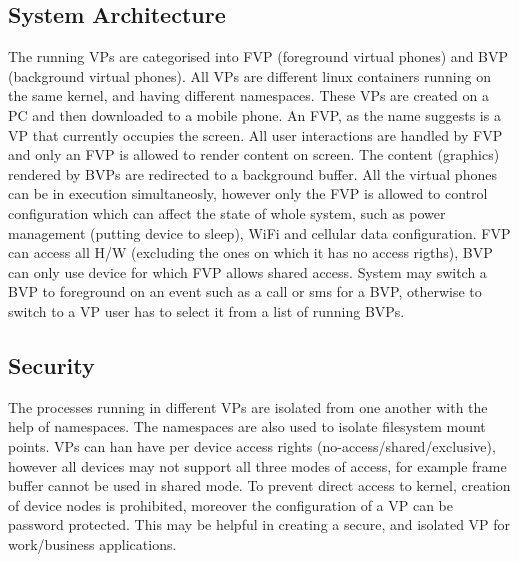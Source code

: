 \documentclass[a4paper,10pt]{article}
\begin{document}
\subsection*{System Architecture}
The running VPs are categorised into FVP (foreground virtual phones) and BVP (background virtual phones). 
All VPs are different linux containers running on the same kernel, and having different namespaces.
These VPs are created on a PC and then downloaded to a mobile phone.
An FVP, as the name suggests is a VP that currently occupies the screen. All user interactions are handled by FVP and only an FVP is allowed to render content on screen. The 
content (graphics) rendered by BVPs are redirected to a background buffer. All the virtual phones can be in execution simultaneosly, however
 only the FVP is allowed to control configuration which can affect the state of whole system, such as power management (putting device to sleep), WiFi
 and cellular data configuration.
 FVP can access all H/W (excluding the ones on which it has no access rigths), BVP can only use device for which FVP allows shared access.
 System may switch a BVP to foreground on an event such as a call or sms for a BVP, otherwise to switch to a VP user has to select it from a list of running BVPs.
 \subsection*{Security}
 The processes running in different VPs are isolated from one another with the help of namespaces.
 The namespaces are also used to isolate filesystem mount points.
 VPs can han have per device access rights (no-access/shared/exclusive), however all devices may not support all three modes of access, for example frame buffer cannot be used in shared mode.
 To prevent direct access to kernel, creation of device nodes is prohibited, moreover the configuration of a VP can be password protected.
 This may be helpful in creating a secure, and isolated VP for work/business applications.
\end{document}
